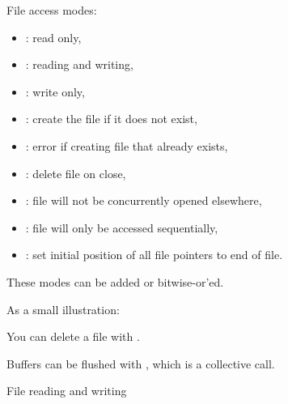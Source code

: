 File access modes:
\begin{itemize}
\item  {}: read only,
\item  {}: reading and writing,
\item  {}: write only,
\item  {}: create the file if it does not exist,
\item  {}: error if creating file that already exists,
\item  {}: delete file on close,
\item  {}: file will not be concurrently opened
  elsewhere,
\item  {}: file will only be accessed sequentially,
\item  {}: set initial position of all file pointers to end
  of file.
\end{itemize}
These modes can be added or bitwise-or'ed.

As a small illustration:

You can delete a file with .

Buffers can be flushed with , which is a collective call.

 {File reading and writing}

